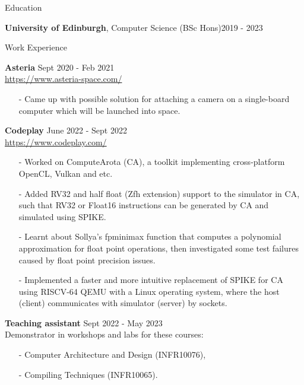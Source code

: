 \documentclass{resume} %
\newcommand{\itemsepval}{-6pt}
\begin{document}
\begin{rSection}{Education}

{\bf  University of Edinburgh}, Computer Science (BSc Hons)\hfill {2019 - 2023}

\end{rSection}

\begin{rSection}{Work Experience}

    \textbf{Asteria} \hfill Sept 2020 - Feb 2021\\
    \url{https://www.asteria-space.com/} \hfill \par
    \begin{itemize}
        \itemsep \itemsepval {} 
        \item[-] Came up with possible solution for attaching a camera on a single-board computer which will be launched into space.
    \end{itemize}
     
    \textbf{Codeplay} \hfill June 2022 - Sept 2022 \\
    \url{https://www.codeplay.com/} \hfill \par
    \begin{itemize}
        \itemsep \itemsepval {} 
        \item[-] Worked on ComputeArota (CA), a toolkit implementing cross-platform OpenCL, Vulkan and etc.
        \item[-] Added RV32 and half float (Zfh extension) support to the simulator in CA, such that RV32 or Float16 instructions can be generated by CA and simulated using SPIKE. 
        \item[-] Learnt about Sollya’s fpminimax function that computes a polynomial approximation for float point operations, then investigated some test failures caused by float point precision issues.
        \item[-] Implemented a faster and more intuitive replacement of SPIKE for CA using RISCV-64 QEMU with a Linux operating system, where the host (client) communicates with simulator (server) by sockets. 
    \end{itemize}
      
    \textbf{Teaching assistant} \hfill Sept 2022 - May 2023     \\
    Demonstrator in workshops and labs for these courses: \hfill \par
    \begin{itemize}
        \itemsep \itemsepval {} 
        \item[-] Computer Architecture and Design (INFR10076), 
        \item[-] Compiling Techniques (INFR10065).
    \end{itemize}


\end{rSection} 
\end{document}
